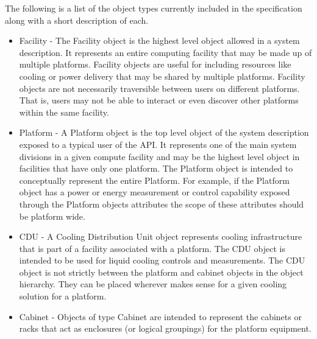 
The following is a list of the object types currently included in the specification along with a short description of each.
\begin{itemize}[noitemsep,nolistsep] %
	\item{
Facility - The Facility object is the highest level object allowed in a system description. 
It represents an entire computing facility that may be made up of multiple platforms.
Facility objects are useful for including resources like cooling or power delivery that may be shared by multiple platforms.
Facility objects are not necessarily traversible between users on different platforms. 
That is, users may not be able to interact or even discover other platforms within the same facility.
} 
        \item{
Platform - A Platform object is the top level object of the system description exposed to a typical user of the API.
It represents one of the main system divisions in a given compute facility and may be the highest level object in facilities that have only one platform. 
The Platform object is intended to conceptually represent the entire Platform.
For example, if the Platform object has a power or energy measurement or control capability exposed through the Platform objects attributes the scope of these attributes should be platform wide.
}
	\item{
CDU - A Cooling Distribution Unit object represents cooling infrastructure that is part of a facility associated with a platform. The CDU object is intended to be used
for liquid cooling controls and measurements. The CDU object is not strictly between the platform and cabinet objects in the object hierarchy. They can be placed wherever
makes sense for a given cooling solution for a platform.
}
	\item{
Cabinet - Objects of type Cabinet are intended to represent the cabinets or racks that act as enclosures (or logical groupings) for the platform equipment. 
}
\end{itemize}
